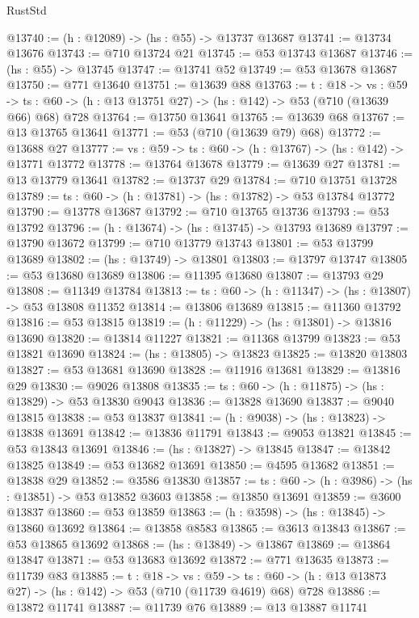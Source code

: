\begin{lexlean}{RustStd}
\begin{coremodule}
@13740 := (h : @12089) -> (hs : @55) -> @13737 @13687
@13741 := @13734 @13676
@13743 := @710 @13724 @21
@13745 := @53 @13743 @13687
@13746 := (hs : @55) -> @13745
@13747 := @13741 @52
@13749 := @53 @13678 @13687
@13750 := @771 @13640
@13751 := @13639 @88
@13763 := {t : @18} ->
  {vs : @59} ->
  {ts : @60} -> (h : @13 @13751 @27) -> (hs : @142) -> @53 (@710 (@13639 @66) @68) @728
@13764 := @13750 @13641
@13765 := @13639 @68
@13767 := @13 @13765 @13641
@13771 := @53 (@710 (@13639 @79) @68)
@13772 := @13688 @27
@13777 := {vs : @59} -> {ts : @60} -> (h : @13767) -> (hs : @142) -> @13771 @13772
@13778 := @13764 @13678
@13779 := @13639 @27
@13781 := @13 @13779 @13641
@13782 := @13737 @29
@13784 := @710 @13751 @13728
@13789 := {ts : @60} -> (h : @13781) -> (hs : @13782) -> @53 @13784 @13772
@13790 := @13778 @13687
@13792 := @710 @13765 @13736
@13793 := @53 @13792
@13796 := (h : @13674) -> (hs : @13745) -> @13793 @13689
@13797 := @13790 @13672
@13799 := @710 @13779 @13743
@13801 := @53 @13799 @13689
@13802 := (hs : @13749) -> @13801
@13803 := @13797 @13747
@13805 := @53 @13680 @13689
@13806 := @11395 @13680
@13807 := @13793 @29
@13808 := @11349 @13784
@13813 := {ts : @60} -> (h : @11347) -> (hs : @13807) -> @53 @13808 @11352
@13814 := @13806 @13689
@13815 := @11360 @13792
@13816 := @53 @13815
@13819 := (h : @11229) -> (hs : @13801) -> @13816 @13690
@13820 := @13814 @11227
@13821 := @11368 @13799
@13823 := @53 @13821 @13690
@13824 := (hs : @13805) -> @13823
@13825 := @13820 @13803
@13827 := @53 @13681 @13690
@13828 := @11916 @13681
@13829 := @13816 @29
@13830 := @9026 @13808
@13835 := {ts : @60} -> (h : @11875) -> (hs : @13829) -> @53 @13830 @9043
@13836 := @13828 @13690
@13837 := @9040 @13815
@13838 := @53 @13837
@13841 := (h : @9038) -> (hs : @13823) -> @13838 @13691
@13842 := @13836 @11791
@13843 := @9053 @13821
@13845 := @53 @13843 @13691
@13846 := (hs : @13827) -> @13845
@13847 := @13842 @13825
@13849 := @53 @13682 @13691
@13850 := @4595 @13682
@13851 := @13838 @29
@13852 := @3586 @13830
@13857 := {ts : @60} -> (h : @3986) -> (hs : @13851) -> @53 @13852 @3603
@13858 := @13850 @13691
@13859 := @3600 @13837
@13860 := @53 @13859
@13863 := (h : @3598) -> (hs : @13845) -> @13860 @13692
@13864 := @13858 @8583
@13865 := @3613 @13843
@13867 := @53 @13865 @13692
@13868 := (hs : @13849) -> @13867
@13869 := @13864 @13847
@13871 := @53 @13683 @13692
@13872 := @771 @13635
@13873 := @11739 @83
@13885 := {t : @18} ->
  {vs : @59} ->
  {ts : @60} -> (h : @13 @13873 @27) -> (hs : @142) -> @53 (@710 (@11739 @4619) @68) @728
@13886 := @13872 @11741
@13887 := @11739 @76
@13889 := @13 @13887 @11741

\end{coremodule}
\end{lexlean}
